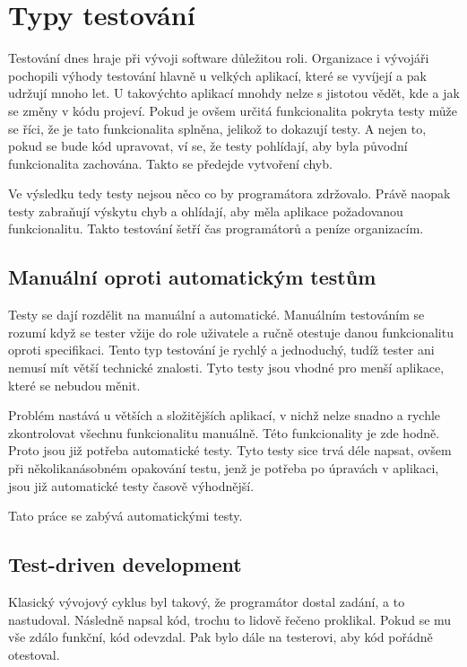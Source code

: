 \documentclass[czech,master,public,dept460,male,cpdeclaration,twoside]{diploma}
\begin{document}
\section{Typy testování}

Testování dnes hraje při vývoji software důležitou roli. Organizace i vývojáři pochopili výhody testování hlavně u velkých aplikací, které se vyvíjejí a pak udržují mnoho let. U takovýchto aplikací mnohdy nelze s jistotou vědět, kde a jak se změny v kódu projeví. Pokud je ovšem určitá funkcionalita pokryta testy může se říci, že je tato funkcionalita splněna, jelikož to dokazují testy. A nejen to, pokud se bude kód upravovat, ví se, že testy pohlídají, aby byla původní funkcionalita zachována. Takto se předejde vytvoření chyb.

Ve výsledku tedy testy nejsou něco co by programátora zdržovalo. Právě naopak testy zabraňují výskytu chyb a ohlídají, aby měla aplikace požadovanou funkcionalitu. Takto testování šetří čas programátorů a peníze organizacím.

\subsection{Manuální oproti automatickým testům}
Testy se dají rozdělit na manuální a automatické. Manuálním testováním se rozumí když se tester vžije do role uživatele a ručně otestuje danou funkcionalitu oproti specifikaci. Tento typ testování je rychlý a jednoduchý, tudíž tester ani nemusí mít větší technické znalosti. Tyto testy jsou vhodné pro menší aplikace, které se nebudou měnit.

Problém nastává u větších a složitějších aplikací, v nichž nelze snadno a rychle zkontrolovat všechnu funkcionalitu manuálně. Této funkcionality je zde hodně. Proto jsou již potřeba automatické testy. Tyto testy sice trvá déle napsat, ovšem při několikanásobném opakování testu, jenž je potřeba po úpravách v aplikaci, jsou již automatické testy časově výhodnější.

Tato práce se zabývá automatickými testy.

\subsection{Test-driven development}
Klasický vývojový cyklus byl takový, že programátor dostal zadání, a to nastudoval. Následně napsal kód, trochu to lidově řečeno proklikal. Pokud se mu vše zdálo funkční, kód odevzdal. Pak bylo dále na testerovi, aby kód pořádně otestoval.
\end{document}
